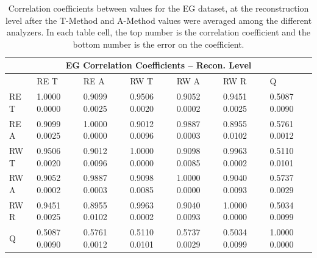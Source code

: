 \begin{table}
\setlength\tabcolsep{15pt}
\small
\centering
\renewcommand{\arraystretch}{1.4}
\begin{tabularx}{0.8\linewidth}{@{\extracolsep{\fill}}lXXXXXX}
  \toprule
  	\multicolumn{7}{c}{{\normalsize EG Correlation Coefficients -- Recon. Level}} \\
  \midrule
  	       & RE T & RE A & RW T & RW A & RW R & \quad Q \\
  \midrule
	RE T   & 1.0000 0.0000 & 0.9099 0.0025 & 0.9506 0.0020 & 0.9052 0.0002 & 0.9451 0.0025 & 0.5087 0.0090  \\
	RE A   & 0.9099 0.0025 & 1.0000 0.0000 & 0.9012 0.0096 & 0.9887 0.0003 & 0.8955 0.0102 & 0.5761 0.0012  \\
	RW T   & 0.9506 0.0020 & 0.9012 0.0096 & 1.0000 0.0000 & 0.9098 0.0085 & 0.9963 0.0002 & 0.5110 0.0101  \\
	RW A   & 0.9052 0.0002 & 0.9887 0.0003 & 0.9098 0.0085 & 1.0000 0.0000 & 0.9040 0.0093 & 0.5737 0.0029  \\
	RW R   & 0.9451 0.0025 & 0.8955 0.0102 & 0.9963 0.0002 & 0.9040 0.0093 & 1.0000 0.0000 & 0.5034 0.0099  \\
	Q      & 0.5087 0.0090 & 0.5761 0.0012 & 0.5110 0.0101 & 0.5737 0.0029 & 0.5034 0.0099 & 1.0000 0.0000  \\
  \bottomrule
\end{tabularx}
\caption[]{Correlation coefficients between \R values for the EG dataset, at the reconstruction level after the \RW T-Method and A-Method \R values were averaged among the different analyzers. In each table cell, the top number is the correlation coefficient and the bottom number is the error on the coefficient.}
\label{tab:Corrs_EG_recon}
\end{table}



